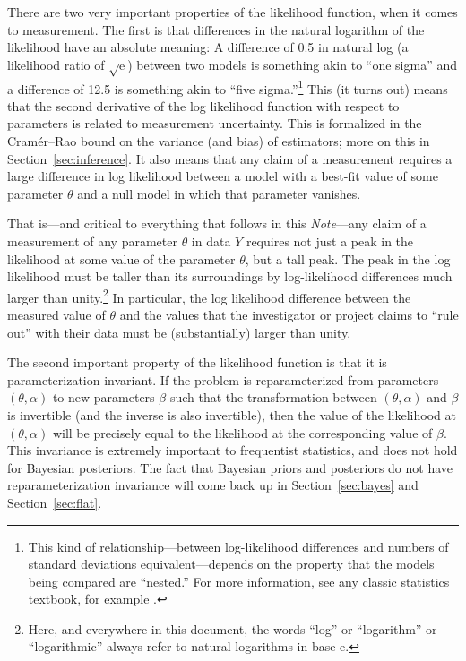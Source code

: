 \documentclass{article}
\newcommand{\documentname}{\textsl{Note}}
\newcommand{\sectionname}{Section}
\newcommand{\secref}[1]{\sectionname~\ref{#1}}
\newcommand{\e}{\mathrm{e}} %
\begin{document}
There are two very important properties of the likelihood function, when it comes to measurement.
The first is that differences in the natural logarithm of the likelihood have an absolute meaning:
A difference of 0.5 in natural log (a likelihood ratio of $\sqrt{\e}$) between two models is something akin to ``one sigma'' and a difference of 12.5 is something akin to ``five sigma.''\footnote{%
This kind of relationship---between log-likelihood differences and numbers of standard deviations equivalent---depends on the property that the models being compared are ``nested.''
For more information, see any classic statistics textbook, for example \cite{casellaberger}.}
This (it turns out) means that the second derivative of the log likelihood function with respect to parameters is related to measurement uncertainty.
This is formalized in the Cram\'er--Rao bound \cite{cramer, rao} on the variance (and bias) of estimators; more on this in \secref{sec:inference}.
It also means that any claim of a measurement requires a large difference in log likelihood between a model with a best-fit value of some parameter $\theta$ and a null model in which that parameter vanishes.

That is---and critical to everything that follows in this \documentname---any claim of a measurement of any parameter $\theta$ in data $Y$ requires not just a peak in the likelihood at some value of the parameter $\theta$, but a tall peak.
The peak in the log likelihood must be taller than its surroundings by log-likelihood differences much larger than unity.\footnote{Here, and everywhere in this document, the words ``log'' or ``logarithm'' or ``logarithmic'' always refer to natural logarithms in base $\e$.}
In particular, the log likelihood difference between the measured value of $\theta$ and the values that the investigator or project claims to ``rule out'' with their data must be (substantially) larger than unity.

The second important property of the likelihood function is that it is par\-am\-e\-ter\-i\-za\-tion-invariant.
If the problem is reparameterized from parameters $(\theta,\alpha)$ to new parameters $\beta$ such that the transformation between $(\theta,\alpha)$ and $\beta$ is invertible (and the inverse is also invertible), then the value of the likelihood at $(\theta,\alpha)$ will be precisely equal to the likelihood at the corresponding value of $\beta$.
This invariance is extremely important to frequentist statistics, and does not hold for Bayesian posteriors.
The fact that Bayesian priors and posteriors do not have reparameterization invariance will come back up in \secref{sec:bayes} and \secref{sec:flat}.
\end{document}

